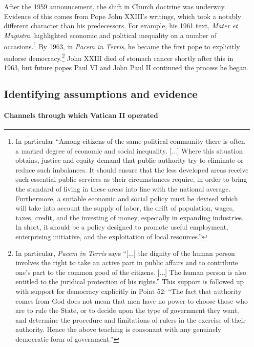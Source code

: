 After the 1959 announcement, the shift in Church doctrine was underway. Evidence of this comes from Pope John XXIII's writings, which took a notably different character than his predecessors. For example, his 1961 text, \textit{Mater et Magistra}, highlighted economic and political inequality on a number of occasions.\footnote{In particular ``Among citizens of the same political community there is often a marked degree of economic and social inequality. {[}...{]} Where this situation obtains, justice and equity demand that public authority try to eliminate or reduce such imbalances. It should ensure that the less developed areas receive such essential public services as their circumstances require, in order to bring the standard of living in these areas into line with the national average. Furthermore, a suitable economic and social policy must be devised which will take into account the supply of labor, the drift of population, wages, taxes, credit, and the investing of money, especially in expanding industries. In short, it should be a policy designed to promote useful employment, enterprising initiative, and the exploitation of local resources.''} By 1963, in \emph{Pacem in Terris}, he became the first pope to explicitly endorse democracy.\footnote{In particular, \textit{Pacem in Terris} says ``[...] the dignity of the human person involves the right to take an active part in public affairs and to contribute one's part to the common good of the citizens. [...] The human person is also entitled to the juridical protection of his rights.'' This support is followed up with support for democracy explicitly in Point 52: ``The fact that authority comes from God does not mean that men have no power to choose those who are to rule the State, or to decide upon the type of government they want, and determine the procedure and limitations of rulers in the exercise of their authority. Hence the above teaching is consonant with any genuinely democratic form of government.''} John XXIII died of stomach cancer shortly after this in 1963, but future popes Paul VI and John Paul II continued the process he began.
\label{par:historical_context_end}

\subsection{Identifying assumptions and evidence}\label{section:identify_ass}

\paragraph{Channels through which Vatican II operated}

